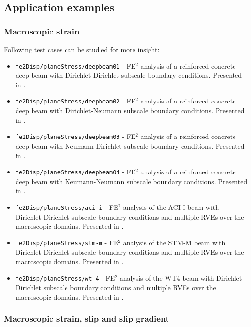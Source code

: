 \documentclass[11pt]{article}
\begin{document}
\subsection{Application examples}
\label{sec:fe2_applications}

\subsubsection{Macroscopic strain}

Following test cases can be studied for more insight:
\begin{itemize}
    \item \texttt{fe2Disp/planeStress/deepbeam01} - FE$^2$ analysis of a reinforced concrete deep beam with Dirichlet-Dirichlet subscale boundary conditions. Presented in \cite{PaperA}.
    \item \texttt{fe2Disp/planeStress/deepbeam02} - FE$^2$ analysis of a reinforced concrete deep beam with Dirichlet-Neumann subscale boundary conditions. Presented in \cite{PaperA}.
    \item \texttt{fe2Disp/planeStress/deepbeam03} - FE$^2$ analysis of a reinforced concrete deep beam with Neumann-Dirichlet subscale boundary conditions. Presented in \cite{PaperA}.
    \item \texttt{fe2Disp/planeStress/deepbeam04} - FE$^2$ analysis of a reinforced concrete deep beam with Neumann-Neumann subscale boundary conditions. Presented in \cite{PaperA}.
    \item \texttt{fe2Disp/planeStress/aci-i} - FE$^2$ analysis of the ACI-I beam with Dirichlet-Dirichlet subscale boundary conditions and multiple RVEs over the macroscopic domains. Presented in \cite{Sciegaj2019semc}.
    \item \texttt{fe2Disp/planeStress/stm-m} - FE$^2$ analysis of the STM-M beam with Dirichlet-Dirichlet subscale boundary conditions and multiple RVEs over the macroscopic domains. Presented in \cite{Sciegaj2019semc}.
    \item \texttt{fe2Disp/planeStress/wt-4} - FE$^2$ analysis of the WT4 beam with Dirichlet-Dirichlet subscale boundary conditions and multiple RVEs over the macroscopic domains. Presented in \cite{Sciegaj2019semc}.
\end{itemize}

\subsubsection{Macroscopic strain, slip and slip gradient}
\end{document}
